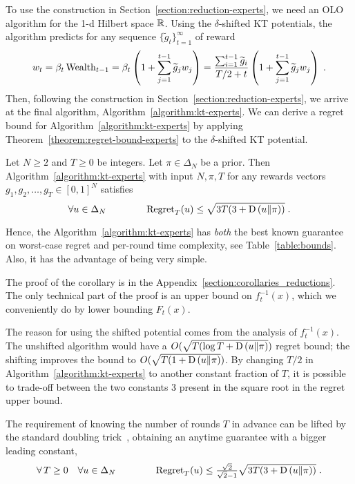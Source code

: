 To use the construction in Section~\ref{section:reduction-experts}, we need an
OLO algorithm for the 1-d Hilbert space $\mathbb{R}$.  Using the $\delta$-shifted KT
potentials, the algorithm predicts for any sequence $\{\widetilde
g_t\}_{t=1}^\infty$ of reward
\[
w_t
= \beta_t \operatorname{Wealth}_{t-1}
= \beta_t \left(1 + \sum_{j=1}^{t-1} \widetilde g_j w_j \right)
= \frac{\sum_{i=1}^{t-1} \widetilde g_i}{T/2+t} \left(1 + \sum_{j=1}^{t-1} \widetilde g_j w_j \right) \; .
\]
Then, following the construction in Section~\ref{section:reduction-experts}, we
arrive at the final algorithm, Algorithm~\ref{algorithm:kt-experts}.
We can derive a regret bound for Algorithm~\ref{algorithm:kt-experts} by
applying Theorem~\ref{theorem:regret-bound-experts} to the $\delta$-shifted KT
potential.
%
\begin{corollary} \label{corollary:kt-experts-regret} Let
$N \ge 2$ and $T \ge 0$ be integers. Let $\pi \in \Delta_N$ be a prior.
Then Algorithm~\ref{algorithm:kt-experts} with input $N,\pi,T$
for any rewards vectors $g_1, g_2, \dots, g_T \in [0,1]^N$ satisfies
\[
\forall u \in \Delta_N \qquad \qquad \operatorname{Regret}_T(u) \le \sqrt{3T (3 + \operatorname{D}\left({u}\middle\|{\pi}\right))} \; .
\]
\end{corollary}
%
Hence, the Algorithm~\ref{algorithm:kt-experts} has \emph{both} the best known
guarantee on worst-case regret and per-round time complexity, see
Table~\ref{table:bounds}. Also, it has the advantage of being very simple.

The proof of the corollary is in the
Appendix~\ref{section:corollaries_reductions}.  The only technical part of the
proof is an upper bound on $f_t^{-1}(x)$, which we conveniently do by lower
bounding $F_t(x)$.

The reason for using the shifted potential comes from the analysis of
$f_t^{-1}(x)$. The unshifted algorithm would have a $O(\sqrt{T (\log T +
\operatorname{D}\left({u}\middle\|{\pi}\right)})$ regret bound; the shifting improves the bound to $O(\sqrt{T (1 +
\operatorname{D}\left({u}\middle\|{\pi}\right)})$.  By changing $T/2$ in Algorithm~\ref{algorithm:kt-experts} to
another constant fraction of $T$, it is possible to trade-off between the two
constants $3$ present in the square root in the regret upper bound.

The requirement of knowing the number of rounds $T$ in advance can be lifted by
the standard doubling trick~\cite[Section 2.3.1]{Shalev-Shwartz-2011},
obtaining an anytime guarantee with a bigger leading constant,
\[
\forall \, T \ge 0 \quad \forall u \in \Delta_N \qquad \qquad
\operatorname{Regret}_T(u) \le \tfrac{\sqrt{2}}{\sqrt{2} - 1} \sqrt{3T (3 + \operatorname{D}\left({u}\middle\|{\pi}\right))} \; .
\]
